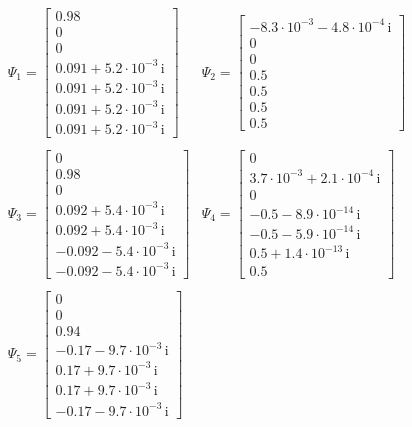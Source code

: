 \documentclass[a4paper]{report}
\begin{document}
\begin{eqnarray*}
\begin{array}{cc} \Psi_1=\left[
\begin{array}{c} 0.98\\ 0\\ 0\\ 0.091 + 5.2\cdot 10^{-3}\, \mathrm{i}\\ 0.091 + 5.2\cdot 10^{-3}\, \mathrm{i}\\ 0.091 + 5.2\cdot 10^{-3}\, \mathrm{i}\\ 0.091 + 5.2\cdot 10^{-3}\, \mathrm{i} \end{array}\right]&
\Psi_2=\left[\begin{array}{c} -8.3\cdot 10^{-3} - 4.8\cdot 10^{-4}\, \mathrm{i}\\ 0\\ 0\\ 0.5\\ 0.5\\ 0.5\\ 0.5 \end{array}\right]\\\\
\Psi_3=\left[\begin{array}{c} 0\\ 0.98\\ 0\\ 0.092 + 5.4\cdot 10^{-3}\, \mathrm{i}\\ 0.092 + 5.4\cdot 10^{-3}\, \mathrm{i}\\ -0.092 - 5.4\cdot 10^{-3}\, \mathrm{i}\\ -0.092 - 5.4\cdot 10^{-3}\, \mathrm{i} \end{array}\right]&
\Psi_4=\left[\begin{array}{c} 0\\ 3.7\cdot 10^{-3} + 2.1\cdot 10^{-4}\, \mathrm{i}\\ 0\\ -0.5 - 8.9\cdot 10^{-14}\, \mathrm{i}\\ -0.5 - 5.9\cdot 10^{-14}\, \mathrm{i}\\ 0.5 + 1.4\cdot 10^{-13}\, \mathrm{i}\\ 0.5 \end{array}\right]\\\\
\Psi_5=\left[\begin{array}{c} 0\\ 0\\ 0.94\\ -0.17 - 9.7\cdot 10^{-3}\, \mathrm{i}\\ 0.17 + 9.7\cdot 10^{-3}\, \mathrm{i}\\ 0.17 + 9.7\cdot 10^{-3}\, \mathrm{i}\\ -0.17 - 9.7\cdot 10^{-3}\, \mathrm{i} \end{array}\right]&

\end{array}
\end{eqnarray*}
\end{document}
